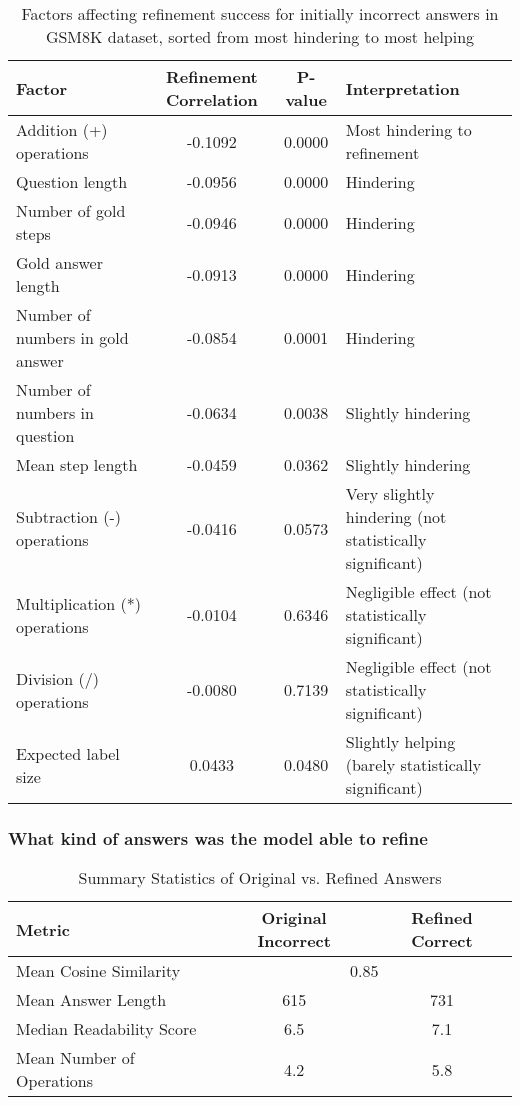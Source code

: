 \documentclass[a4paper,10pt]{article}
\begin{document}
\begin{table}[htbp]
\centering
\setlength{\tabcolsep}{4pt}  %
\begin{tabular}{|l|c|c|p{4.5cm}|}
\hline
\textbf{Factor} & \textbf{Refinement Correlation} & \textbf{P-value} & \textbf{Interpretation} \\
\hline
Addition (+) operations & -0.1092 & 0.0000 & Most hindering to refinement \\
Question length & -0.0956 & 0.0000 & Hindering \\
Number of gold steps & -0.0946 & 0.0000 & Hindering \\
Gold answer length & -0.0913 & 0.0000 & Hindering \\
Number of numbers in gold answer & -0.0854 & 0.0001 & Hindering \\
Number of numbers in question & -0.0634 & 0.0038 & Slightly hindering \\
Mean step length & -0.0459 & 0.0362 & Slightly hindering \\
Subtraction (-) operations & -0.0416 & 0.0573 & Very slightly hindering (not statistically significant) \\
Multiplication (*) operations & -0.0104 & 0.6346 & Negligible effect (not statistically significant) \\
Division (/) operations & -0.0080 & 0.7139 & Negligible effect (not statistically significant) \\
Expected label size & 0.0433 & 0.0480 & Slightly helping (barely statistically significant) \\
\hline
\end{tabular}
\caption{Factors affecting refinement success for initially incorrect answers in GSM8K dataset, sorted from most hindering to most helping}
\label{tab:gsm8k_refinement_correlations}
\end{table}

\subsubsection{What kind of answers was the model able to refine}
\begin{table}[ht]
\centering
\begin{tabular}{lcc}
\hline
Metric & Original Incorrect & Refined Correct \\
\hline
Mean Cosine Similarity & \multicolumn{2}{c}{0.85} \\
Mean Answer Length & 615 & 731 \\
Median Readability Score & 6.5 & 7.1 \\
Mean Number of Operations & 4.2 & 5.8 \\
\hline
\end{tabular}
\caption{Summary Statistics of Original vs. Refined Answers}
\label{tab:summary}
\end{table}
\end{document}
